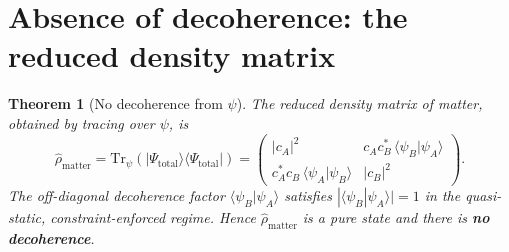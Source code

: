 \documentclass[12pt,a4paper]{article}
\newtheorem{theorem}{Theorem}
\theoremstyle{definition}
\theoremstyle{remark}
\newcommand{\Tr}{\mathrm{Tr}}
\begin{document}
\section{Absence of decoherence: the reduced density matrix}
\label{sec:decoherence}

\begin{theorem}[No decoherence from $\psi$]
\label{thm:no_decoherence}
The reduced density matrix of matter, obtained by tracing over $\psi$, is
\begin{equation}
\label{eq:rho_reduced}
\hat{\rho}_{\mathrm{matter}} = \Tr_\psi\!\left(|\Psi_{\mathrm{total}}\rangle
\langle\Psi_{\mathrm{total}}|\right)
= \begin{pmatrix} |c_A|^2 & c_A c_B^* \,\langle\psi_B|\psi_A\rangle \\
c_A^* c_B\,\langle\psi_A|\psi_B\rangle & |c_B|^2 \end{pmatrix}.
\end{equation}
The off-diagonal decoherence factor $\langle\psi_B|\psi_A\rangle$ satisfies
$|\langle\psi_B|\psi_A\rangle| = 1$ in the quasi-static, constraint-enforced
regime.  Hence $\hat{\rho}_{\mathrm{matter}}$ is a pure state and there is
\textbf{no decoherence}.
\end{theorem}
\end{document}
